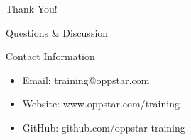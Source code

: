 \documentclass[aspectratio=169]{beamer}
\begin{document}
\begin{frame}[plain]
  \begin{center}
    {\Huge Thank You!}

    \vspace{1cm}

    {\Large Questions \& Discussion}

    \vspace{1cm}

    \begin{block}{Contact Information}
      \begin{itemize}
        \item Email: training@oppstar.com
        \item Website: www.oppstar.com/training
        \item GitHub: github.com/oppstar-training
      \end{itemize}
    \end{block}
  \end{center}
\end{frame}
\end{document}
